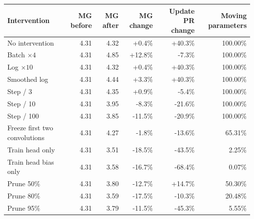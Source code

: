 \begin{tabular}{lrrrrr}
\toprule
Intervention & MG before & MG after & MG change & Update PR change & Moving parameters \\
\midrule
No intervention & 4.31 & 4.32 & +0.4\% & +40.3\% & 100.00\% \\
Batch $\times4$ & 4.31 & 4.85 & +12.8\% & -7.3\% & 100.00\% \\
Log $\times10$ & 4.31 & 4.32 & +0.4\% & +40.3\% & 100.00\% \\
Smoothed log & 4.31 & 4.44 & +3.3\% & +40.3\% & 100.00\% \\
Step / 3 & 4.31 & 4.35 & +0.9\% & -5.4\% & 100.00\% \\
Step / 10 & 4.31 & 3.95 & -8.3\% & -21.6\% & 100.00\% \\
Step / 100 & 4.31 & 3.85 & -11.5\% & -20.9\% & 100.00\% \\
Freeze first two convolutions & 4.31 & 4.27 & -1.8\% & -13.6\% & 65.31\% \\
Train head only & 4.31 & 3.51 & -18.5\% & -43.5\% & 2.25\% \\
Train head bias only & 4.31 & 3.58 & -16.7\% & -68.4\% & 0.07\% \\
Prune 50\% & 4.31 & 3.80 & -12.7\% & +14.7\% & 50.30\% \\
Prune 80\% & 4.31 & 3.59 & -17.5\% & -10.3\% & 20.48\% \\
Prune 95\% & 4.31 & 3.79 & -11.5\% & -45.3\% & 5.55\% \\
\bottomrule
\end{tabular}
